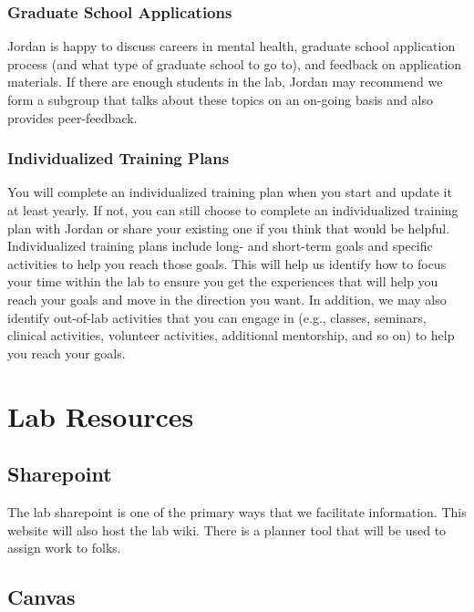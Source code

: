 \documentclass[
]{book}
\begin{document}
\hypertarget{graduate-school-applications}{%
\subsection{Graduate School Applications}\label{graduate-school-applications}}

Jordan is happy to discuss careers in mental health, graduate school application process (and what type of graduate school to go to), and feedback on application materials. If there are enough students in the lab, Jordan may recommend we form a subgroup that talks about these topics on an on-going basis and also provides peer-feedback.

\hypertarget{individualized-training-plans}{%
\subsection{Individualized Training Plans}\label{individualized-training-plans}}

You will complete an individualized training plan when you start and update it at least yearly. If not, you can still choose to complete an individualized training plan with Jordan or share your existing one if you think that would be helpful. Individualized training plans include long- and short-term goals and specific activities to help you reach those goals. This will help us identify how to focus your time within the lab to ensure you get the experiences that will help you reach your goals and move in the direction you want. In addition, we may also identify out-of-lab activities that you can engage in (e.g., classes, seminars, clinical activities, volunteer activities, additional mentorship, and so on) to help you reach your goals.

\hypertarget{lab-resources}{%
\chapter{Lab Resources}\label{lab-resources}}

\hypertarget{sharepoint}{%
\section{Sharepoint}\label{sharepoint}}

The lab sharepoint is one of the primary ways that we facilitate information. This website will also host the lab wiki. There is a planner tool that will be used to assign work to folks.

\hypertarget{canvas}{%
\section{Canvas}\label{canvas}}
\end{document}
